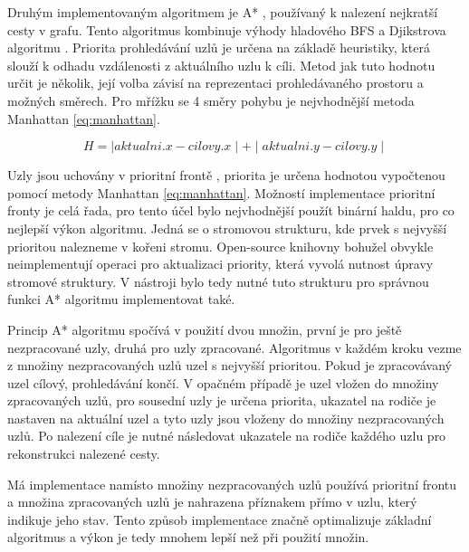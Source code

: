 \documentclass[czech,bachelor,public,dept460,male,oneside]{diploma}
\begin{document}
	Druhým implementovaným algoritmem je A* \cite{aStar}, používaný k nalezení nejkratší cesty v grafu. Tento algoritmus kombinuje výhody hladového BFS a Djikstrova algoritmu \cite{aStar}. Priorita prohledávání uzlů je určena na základě heuristiky, která slouží k odhadu vzdálenosti z aktuálního uzlu k cíli. Metod jak tuto hodnotu určit je několik, její volba závisí na reprezentaci prohledávaného prostoru a možných směrech. Pro mřížku se 4 směry pohybu je nejvhodnější metoda Manhattan \ref{eq:manhattan}.
	
	\begin{equation}
		H = \mid aktualni.x - cilovy.x \mid + \mid aktualni.y - cilovy.y \mid
		\label{eq:manhattan}
	\end{equation}
	
	Uzly jsou uchovány v prioritní frontě \cite{queue}, priorita je určena hodnotou vypočtenou pomocí metody Manhattan \ref{eq:manhattan}. Možností implementace prioritní fronty je celá řada, pro tento účel bylo nejvhodnější použít binární haldu, pro co nejlepší výkon algoritmu. Jedná se o stromovou strukturu, kde prvek s nejvyšší prioritou nalezneme v kořeni stromu. Open-source knihovny bohužel obvykle neimplementují operaci pro aktualizaci priority, která vyvolá nutnost úpravy stromové struktury. V nástroji bylo tedy nutné tuto strukturu pro správnou funkci A* algoritmu implementovat také. 
	
	Princip A* algoritmu spočívá v použití dvou množin, první je pro ještě nezpracované uzly, druhá pro uzly zpracované. Algoritmus v každém kroku vezme z množiny nezpracovaných uzlů uzel s nejvyšší prioritou. Pokud je zpracovávaný uzel cílový, prohledávání končí. V opačném případě je uzel vložen do množiny zpracovaných uzlů, pro sousední uzly je určena priorita, ukazatel na rodiče je nastaven na aktuální uzel a tyto uzly jsou vloženy do množiny nezpracovaných uzlů. Po nalezení cíle je nutné následovat ukazatele na rodiče každého uzlu pro rekonstrukci nalezené cesty. 
	
	Má implementace namísto množiny nezpracovaných uzlů používá prioritní frontu a množina zpracovaných uzlů je nahrazena příznakem přímo v uzlu, který indikuje jeho stav. Tento způsob implementace značně optimalizuje základní algoritmus a výkon je tedy mnohem lepší než při použití množin.
		
\end{document}
